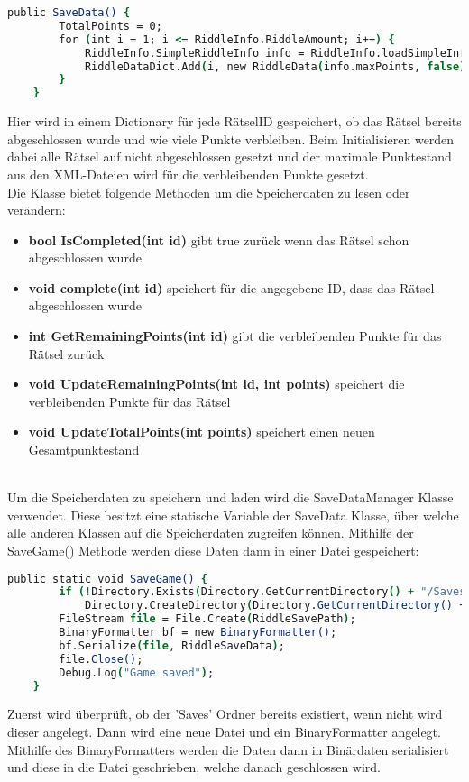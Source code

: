 {\begin{lstlisting}[language=csh, caption={Serialisierbare Speicherdaten für die Rätsel}]
    public SaveData() {
		TotalPoints = 0;
        for (int i = 1; i <= RiddleInfo.RiddleAmount; i++) {
            RiddleInfo.SimpleRiddleInfo info = RiddleInfo.loadSimpleInfoFromXML(i);
            RiddleDataDict.Add(i, new RiddleData(info.maxPoints, false));
        }
    }
\end{lstlisting}
Hier wird in einem Dictionary für jede RätselID gespeichert, ob das Rätsel bereits abgeschlossen wurde und wie viele Punkte verbleiben. Beim Initialisieren werden dabei alle Rätsel auf nicht abgeschlossen gesetzt und der maximale Punktestand aus den XML-Dateien wird für die verbleibenden Punkte gesetzt.\\
Die Klasse bietet folgende Methoden um die Speicherdaten zu lesen oder verändern:
\begin{itemize}
\item \textbf{bool IsCompleted(int id)} gibt true zurück wenn das Rätsel schon abgeschlossen wurde
\item \textbf{void complete(int id)} speichert für die angegebene ID, dass das Rätsel abgeschlossen wurde
\item \textbf{int GetRemainingPoints(int id)} gibt die verbleibenden Punkte für das Rätsel zurück
\item \textbf{void UpdateRemainingPoints(int id, int points)} speichert die verbleibenden Punkte für das Rätsel
\item \textbf{void UpdateTotalPoints(int points)} speichert einen neuen Gesamtpunktestand
\end{itemize}\\

Um die Speicherdaten zu speichern und laden wird die SaveDataManager Klasse verwendet.
Diese besitzt eine statische Variable der SaveData Klasse, über welche alle anderen Klassen auf die Speicherdaten zugreifen können. Mithilfe der SaveGame() Methode werden diese Daten dann in einer Datei gespeichert:
\begin{lstlisting}[language=csh, caption={Methode um SaveData in eine Datei zu speichern}]
public static void SaveGame() {
        if (!Directory.Exists(Directory.GetCurrentDirectory() + "/Saves"))
            Directory.CreateDirectory(Directory.GetCurrentDirectory() + "/Saves");
        FileStream file = File.Create(RiddleSavePath);
        BinaryFormatter bf = new BinaryFormatter();
        bf.Serialize(file, RiddleSaveData);
        file.Close();
        Debug.Log("Game saved");
    }
\end{lstlisting}
Zuerst wird überprüft, ob der 'Saves' Ordner bereits existiert, wenn nicht wird dieser angelegt. Dann wird eine neue Datei und ein BinaryFormatter angelegt. Mithilfe des BinaryFormatters werden die Daten dann in Binärdaten serialisiert und diese in die Datei geschrieben, welche danach geschlossen wird.\\

}

